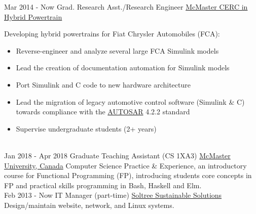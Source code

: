 \documentclass[letterpaper]{twentysecondcv} %
\begin{document}
\vspace{-.5em}
\begin{twenty} %
  \twentyitem
  {Mar 2014 -}
  {Now}
  {Grad. Research Asst./Research Engineer}
  {%
    \href{http://hybrid.mcmaster.ca/}{McMaster CERC in Hybrid Powertrain}}
  {}
  {Developing hybrid powertrains for Fiat Chrysler Automobiles (FCA):
    \begin{itemize}
      \item Reverse-engineer and analyze several large FCA Simulink models
      \item Lead the creation of documentation automation for Simulink models
      \item Port Simulink and C code to new hardware architecture
      \item Lead the migration of legacy automotive control software (Simulink \& C) towards compliance with the \href{https://www.autosar.org/standards/classic-platform/}{AUTOSAR} 4.2.2 standard
      \item Supervise undergraduate students (2+ years)
    \end{itemize}}
	\\
  \twentyitem
  {Jan 2018 -}
  {Apr 2018}
  {Graduate Teaching Assistant (CS 1XA3)}
  {\href{https://www.mcmaster.ca/}{McMaster University, Canada}}
  {}
  {Computer Science Practice \& Experience, an introductory course for Functional Programming (FP), introducing students core concepts in FP and practical skills programming in Bash, Haskell and Elm.
}
	\\
	\twentyitem
	{Feb 2013 -}
	{Now}
	{IT Manager (part-time)}
	{\href{http://www.soltree.net/}{Soltree Sustainable Solutions}}
	{}
  {Design/maintain website, network, and Linux systems.}

\end{twenty}
\end{document}
